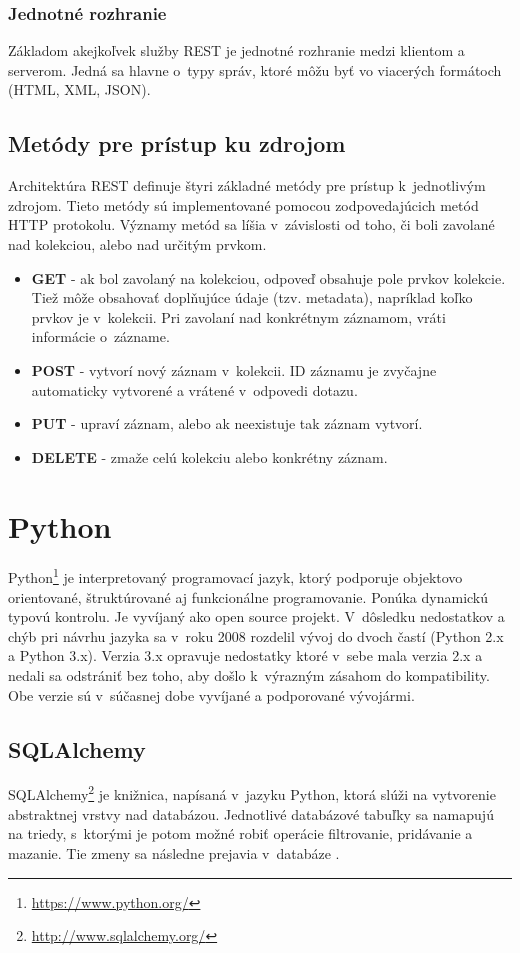 \documentclass[slovak]{fitthesis}
\begin{document}
\subsubsection{Jednotné rozhranie}
Základom akejkoľvek služby REST je jednotné rozhranie medzi klientom a serverom. Jedná sa hlavne o~typy správ, ktoré môžu byť vo viacerých formátoch (HTML, XML, JSON).

\subsection{Metódy pre prístup ku zdrojom}\label{httpMetody}
Architektúra REST definuje štyri základné metódy pre prístup k~jednotlivým zdrojom. Tieto metódy sú implementované pomocou zodpovedajúcich metód HTTP protokolu. Významy metód sa líšia v~závislosti od toho, či boli zavolané nad kolekciou, alebo nad určitým prvkom.
\begin{itemize}
    \item \textbf{GET} - ak bol zavolaný na kolekciou, odpoveď obsahuje pole prvkov kolekcie. Tiež môže obsahovať doplňujúce údaje (tzv. metadata), napríklad koľko prvkov je v~kolekcii.
    Pri zavolaní nad konkrétnym záznamom, vráti informácie o~zázname.
    \item \textbf{POST} - vytvorí nový záznam v~kolekcii. ID záznamu je zvyčajne automaticky vytvorené a vrátené v~odpovedi dotazu.
    \item \textbf{PUT} - upraví záznam, alebo ak neexistuje tak záznam vytvorí.
    \item \textbf{DELETE} - zmaže celú kolekciu alebo konkrétny záznam.
\end{itemize}

\section{Python}\label{python}
Python\footnote{\url{https://www.python.org/}} je interpretovaný programovací jazyk, ktorý podporuje objektovo orientované, štruktúrované aj funkcionálne programovanie. Ponúka dynamickú typovú kontrolu. Je vyvíjaný ako open source projekt. V~dôsledku nedostatkov a chýb pri návrhu jazyka sa v~roku 2008 rozdelil vývoj do dvoch častí (Python 2.x a Python 3.x). Verzia 3.x opravuje nedostatky ktoré v~sebe mala verzia 2.x a nedali sa odstrániť bez toho, aby došlo k~výrazným zásahom do kompatibility. Obe verzie sú v~súčasnej dobe vyvíjané a podporované vývojármi.

\subsection{SQLAlchemy}\label{SQLAlchemy}
SQLAlchemy\footnote{\url{http://www.sqlalchemy.org/}} je knižnica, napísaná v~jazyku Python, ktorá slúži na vytvorenie abstraktnej vrstvy nad databázou. Jednotlivé databázové tabuľky sa namapujú na triedy, s~ktorými je potom možné robiť operácie filtrovanie, pridávanie a mazanie. Tie zmeny sa následne prejavia v~databáze \cite{copeland2008essential}.
\end{document}
